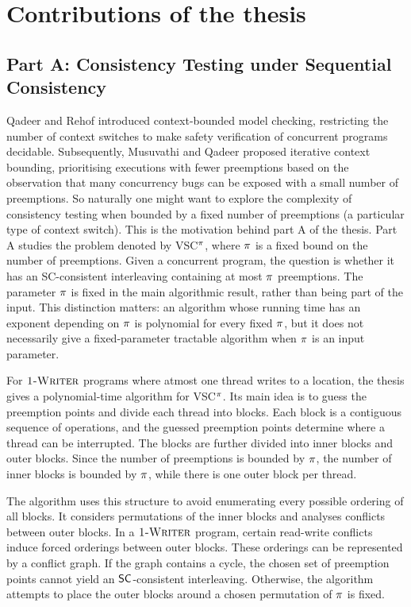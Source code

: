 \section{Contributions of the thesis}
\subsection{Part A: Consistency Testing under Sequential Consistency}

Qadeer and Rehof \cite{motivation_qadeer2005context} introduced context-bounded model checking, restricting the number of context switches to make safety  verification of concurrent programs decidable. Subsequently, Musuvathi and Qadeer \cite{DBLP:conf/pldi/MusuvathiQ07} proposed iterative context bounding,  prioritising executions with fewer preemptions based on the observation that many concurrency bugs can be exposed with a small number of preemptions. So naturally one might want to explore the complexity of  consistency testing when bounded by a fixed number of preemptions (a particular type of context switch). This is the motivation behind part A of the thesis. Part A studies the problem denoted by VSC$^\pi$, where $\pi$ is a fixed bound on the number of preemptions. Given a concurrent program, the question is whether it has an SC-consistent interleaving containing at most $\pi$ preemptions. The parameter  $\pi$ is fixed in the main algorithmic result, rather than being part of the input. This distinction matters: an algorithm whose running time has an exponent depending on $\pi$ is polynomial for every fixed $\pi$, but it does not necessarily give a fixed-parameter tractable algorithm when $\pi$ is an input parameter.

For $\textsc{1-Writer}$ programs where atmost one thread writes to a location, the thesis gives a polynomial-time algorithm for VSC$^\pi$. Its main idea is to guess the preemption points and divide each thread into blocks. Each block is a contiguous sequence of operations, and the guessed preemption points determine where a thread can be interrupted. The blocks are further divided into inner blocks and outer blocks. Since the number of preemptions is bounded by $\pi$, the number of inner blocks is bounded by $\pi$, while there is one outer block per thread.

The algorithm uses this structure to avoid enumerating every possible ordering of all blocks. It considers permutations of the inner blocks and analyses conflicts between outer blocks. In a $\textsc{1-Writer}$ program, certain read-write conflicts induce forced orderings between outer blocks. These orderings can be represented by a conflict graph. If the graph contains a cycle, the chosen set of preemption points cannot yield an $\mathsf{SC}$-consistent interleaving. Otherwise, the algorithm attempts to place the outer blocks around a chosen permutation of $\pi$ is fixed.

